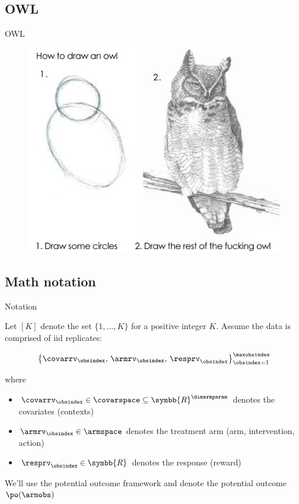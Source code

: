 \documentclass[aspectratio=169, professionalfonts]{beamer}
\begin{document}
\subsection{OWL}
\begin{frame}{OWL}
	\begin{figure}
		\includegraphics[width=.6\textwidth]{figures/how-to-draw-an-owl}
	\end{figure}
\end{frame}
\subsection{Math notation}
\begin{frame}[label={sec:org00d2d44}]{Notation}

	Let $[K]$ denote the set $\{1, \ldots, K \}$ for a positive integer $K$. Assume
	the data is comprised of iid replicates:

	\begin{equation}
		\left\{{\covarrv}_{\obsindex},\, {\armrv}_{\obsindex},\,
		{\resprv}_{\obsindex} \right\}_{\obsindex = 1}^{\maxobsindex}
	\end{equation}

	where
	\vfill \pause

	\begin{itemize}
		\item $\covarrv_{\obsindex} \in \covarspace \subseteq
			      \symbb{R}^{\dimarmparam}$ denotes the covariates (contexts)

		\item $\armrv_{ \obsindex} \in \armspace$ denotes the treatment arm (arm,
		      intervention, action)

		\item $\resprv_{ \obsindex} \in \symbb{R}$ denotes the response (reward)
	\end{itemize}

	\vfill \pause

	We'll use the potential outcome framework and denote the potential outcome 	$\po(\armobs)$

\end{frame}
\end{document}
